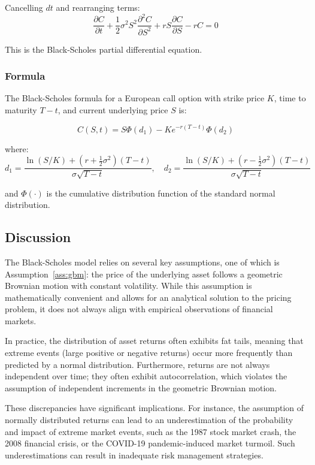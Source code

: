 Cancelling \( dt \) and rearranging terms:
\[
\frac{\partial C}{\partial t} + \frac{1}{2} \sigma^2 S^2 \frac{\partial^2 C}{\partial S^2} + r S \frac{\partial C}{\partial S} - rC = 0
\]

This is the Black-Scholes partial differential equation.

\subsubsection{Formula}

The Black-Scholes formula for a European call option with strike price \( K \), time to maturity \( T - t \), and current underlying price \( S \) is:

\[
C(S,t) = S \Phi(d_1) - K e^{-r(T - t)} \Phi(d_2)
\]

where:
\[
d_1 = \frac{\ln(S/K) + (r + \frac{1}{2} \sigma^2)(T - t)}{\sigma \sqrt{T - t}}, \quad
d_2 = \frac{\ln(S/K) + (r - \frac{1}{2} \sigma^2)(T - t)}{\sigma \sqrt{T - t}}
\]

and \( \Phi(\cdot) \) is the cumulative distribution function of the standard normal distribution.

\subsection{Discussion}
The Black-Scholes model relies on several key assumptions, one of which is Assumption~\ref{ass:gbm}: the price of the underlying asset follows a geometric Brownian motion with constant volatility. While this assumption is mathematically convenient and allows for an analytical solution to the pricing problem, it does not always align with empirical observations of financial markets.

In practice, the distribution of asset returns often exhibits fat tails, meaning that extreme events (large positive or negative returns) occur more frequently than predicted by a normal distribution. Furthermore, returns are not always independent over time; they often exhibit autocorrelation, which violates the assumption of independent increments in the geometric Brownian motion.

These discrepancies have significant implications. For instance, the assumption of normally distributed returns can lead to an underestimation of the probability and impact of extreme market events, such as the 1987 stock market crash, the 2008 financial crisis, or the COVID-19 pandemic-induced market turmoil. Such underestimations can result in inadequate risk management strategies.

